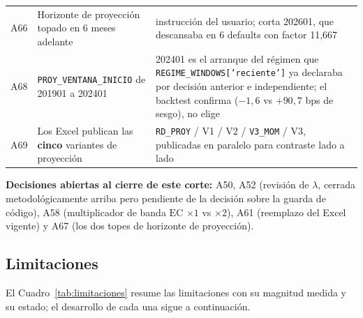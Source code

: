 \documentclass[12pt, a4paper]{article}
\newcommand{\EC}{\ensuremath{\mathrm{EC}}}
\begin{document}
\begin{table}[H]
\begin{tabular}{lp{4.3cm}p{7.3cm}}
A66 & Horizonte de proyección topado en 6 meses adelante & instrucción del usuario; corta 202601, que descansaba en 6 defaults con factor 11,667 \\
A68 & \texttt{PROY\_VENTANA\_INICIO} de 201901 a 202401 & 202401 es el arranque del régimen que \texttt{REGIME\_WINDOWS['reciente']} ya declaraba por decisión anterior e independiente; el backtest confirma ($-1{,}6$ vs $+90{,}7$ bps de sesgo), no elige \\
A69 & Los Excel publican las \textbf{cinco} variantes de proyección & \texttt{RD\_PROY} / V1 / V2 / \texttt{V3\_MOM} / V3, publicadas en paralelo para contraste lado a lado \\
\bottomrule
\end{tabular}
\end{table}
\noindent\textbf{Decisiones abiertas al cierre de este corte:} A50, A52 (revisión de $\lambda$, cerrada
metodológicamente arriba pero pendiente de la decisión sobre la guarda de código), A58
(multiplicador de banda $\EC$ $\times1$ vs $\times2$), A61 (reemplazo del Excel vigente) y A67 (los
dos topes de horizonte de proyección).

\subsection{Limitaciones}
\label{sec:limitaciones}
\noindent El Cuadro~\ref{tab:limitaciones} resume las limitaciones con su magnitud medida y su
estado; el desarrollo de cada una sigue a continuación.
\end{document}
